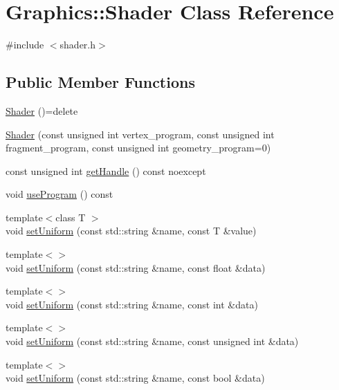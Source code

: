 \hypertarget{class_graphics_1_1_shader}{}\section{Graphics\+:\+:Shader Class Reference}
\label{class_graphics_1_1_shader}


{\ttfamily \#include $<$shader.\+h$>$}

\subsection*{Public Member Functions}
\begin{DoxyCompactItemize}
\item 
\hyperlink{class_graphics_1_1_shader_a8160ac75561d286213ec65ec30d9eeb0}{Shader} ()=delete
\item 
\hyperlink{class_graphics_1_1_shader_aef598fb3433acea1aff5e57499d08fed}{Shader} (const unsigned int vertex\+\_\+program, const unsigned int fragment\+\_\+program, const unsigned int geometry\+\_\+program=0)
\item 
const unsigned int \hyperlink{class_graphics_1_1_shader_a8310ca4e5e8dba64d1ad3636bada078b}{get\+Handle} () const noexcept
\item 
void \hyperlink{class_graphics_1_1_shader_a564d1802984fc0501f33528e8fe5aad3}{use\+Program} () const 
\item 
{\footnotesize template$<$class T $>$ }\\void \hyperlink{class_graphics_1_1_shader_a78f6ffc5d8fc4d3eee3189dae6e8434e}{set\+Uniform} (const std\+::string \&name, const T \&value)
\item 
{\footnotesize template$<$$>$ }\\void \hyperlink{class_graphics_1_1_shader_ae87e687bdc5b41e7162a3fd17cbe4b8c}{set\+Uniform} (const std\+::string \&name, const float \&data)
\item 
{\footnotesize template$<$$>$ }\\void \hyperlink{class_graphics_1_1_shader_a053a18f48bf33e427ae912e420f41300}{set\+Uniform} (const std\+::string \&name, const int \&data)
\item 
{\footnotesize template$<$$>$ }\\void \hyperlink{class_graphics_1_1_shader_abe8990b3404bfedef5a29d7557bf2ad8}{set\+Uniform} (const std\+::string \&name, const unsigned int \&data)
\item 
{\footnotesize template$<$$>$ }\\void \hyperlink{class_graphics_1_1_shader_a70df2013998b9cb0efce4bb3177c9599}{set\+Uniform} (const std\+::string \&name, const bool \&data)
\end{DoxyCompactItemize}
